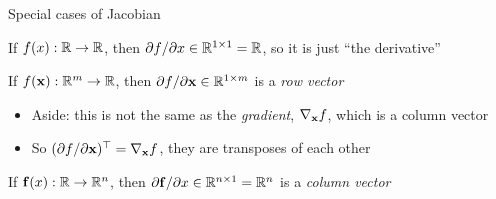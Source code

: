 \documentclass[8pt, aspectratio=149]{beamer}
\begin{document}
\begin{frame}{Special cases of Jacobian}

    If \( f(x) : \mathbb{R} \to \mathbb{R} \), then \( \partial f / \partial x \in \mathbb{R}^{1 \times 1} = \mathbb{R} \), so it is just ``the derivative'' 
    
    \vspace{2em} 
    If \( f(\mVector{x}) : \R^m \to \R \), then \( \partial f / \partial \mVector{x} \in \R^{1 \times m} \) is a \textit{row vector}  
    \begin{itemize}
        \item Aside: this is not the same as the \textit{gradient}, \( \nabla_{\mVector{x}}f \), which is a column vector 
        \item So \( (\partial f / \partial \mVector{x})^\T = \nabla_{\mVector{x}}f \), they are transposes of each other 
    \end{itemize}

    \vspace{2em} 
    If \( \mVector{f}(x) : \R \to \R^n \), then \( \partial \mVector{f} / \partial x \in \R^{n \times 1} = \R^n \) is a \textit{column vector}  

\end{frame}
\end{document}
